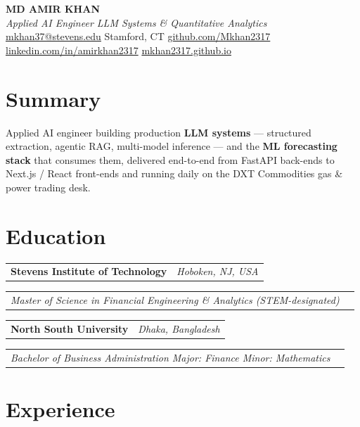 \documentclass[10pt,letterpaper]{article}
\makeatletter
\newcommand{\entryrow}[2]{%
  \noindent\begin{tabularx}{\linewidth}{@{}X@{}r@{}}%
    #1 & #2 \\
  \end{tabularx}\par\vspace{1pt}%
}
\newcommand{\headline}[4]{%
  \entryrow{\textbf{#1}}{\normalfont\itshape #2}%
  \entryrow{\textit{#3}}{\normalfont\itshape #4}%
}
\makeatother
\begin{document}
\begin{center}
  {\LARGE\bfseries MD AMIR KHAN}\\[2pt]
  {\small\itshape Applied AI Engineer \; \textperiodcentered\; LLM Systems \& Quantitative Analytics}\\[3pt]
  \small
  \href{mailto:mkhan37@stevens.edu}{mkhan37@stevens.edu}
  \; \textperiodcentered\;
  Stamford, CT
  \; \textperiodcentered\;
  \href{https://github.com/Mkhan2317}{github.com/Mkhan2317}
  \; \textperiodcentered\;
  \href{https://linkedin.com/in/amirkhan2317}{linkedin.com/in/amirkhan2317}
  \; \textperiodcentered\;
  \href{https://mkhan2317.github.io}{mkhan2317.github.io}
\end{center}

\section*{Summary}
\small
Applied AI engineer building production \textbf{LLM systems} --- structured extraction, agentic RAG, multi-model inference --- and the \textbf{ML forecasting stack} that consumes them, delivered end-to-end from FastAPI back-ends to Next.js / React front-ends and running daily on the DXT Commodities gas \& power trading desk.

\section*{Education}
\small
\headline{Stevens Institute of Technology}{Hoboken, NJ, USA}{Master of Science in Financial Engineering \& Analytics (STEM-designated)}{}
\vspace{4pt}

\headline{North South University}{Dhaka, Bangladesh}{Bachelor of Business Administration \; \textperiodcentered\; Major: Finance \; \textperiodcentered\; Minor: Mathematics}{}

\section*{Experience}
\small
\end{document}

